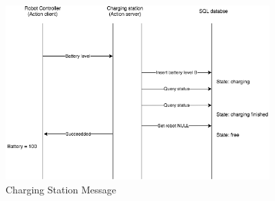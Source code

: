 \begin{figure}[htbp]
    \centering
    \includegraphics[width = 0.9\textwidth]{content/images/ch4/charging_station_message.drawio.png}
    \caption{Charging Station Message}
    \label{fig:charging_station_message}
\end{figure}

